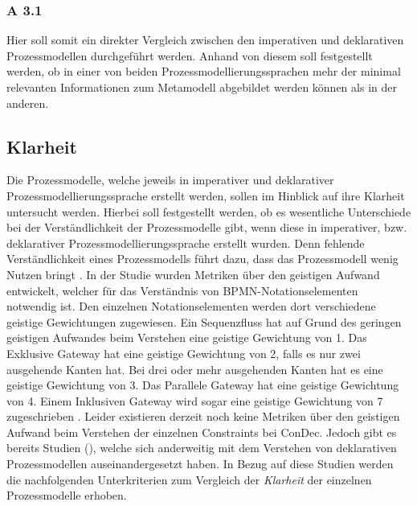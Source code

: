 \subsubsection{A 3.1}

Hier soll somit ein direkter Vergleich zwischen den imperativen und deklarativen Prozessmodellen durchgeführt werden. Anhand von diesem soll festgestellt werden, ob in einer von beiden Prozessmodellierungssprachen mehr der minimal relevanten Informationen zum Metamodell abgebildet werden können als in der anderen.\newline

\subsection{Klarheit}

Die Prozessmodelle, welche jeweils in imperativer und deklarativer Prozessmodellierungssprache erstellt werden, sollen im Hinblick auf ihre Klarheit untersucht werden. Hierbei soll festgestellt werden, ob es wesentliche Unterschiede bei der Verständlichkeit der Prozessmodelle gibt, wenn diese in imperativer, bzw. deklarativer Prozessmodellierungssprache erstellt wurden. Denn fehlende Verständlichkeit eines Prozessmodells führt dazu, dass das Prozessmodell wenig Nutzen bringt \cite{journals95, freund2007,reinshagen2009}. \newline
In der Studie \cite{gruhn2006adopting} wurden Metriken über den geistigen Aufwand entwickelt, welcher für das Verständnis von BPMN-Notationselementen notwendig ist. Den einzelnen Notationselementen werden dort verschiedene geistige Gewichtungen zugewiesen. Ein Sequenzfluss hat auf Grund des geringen geistigen Aufwandes beim Verstehen eine geistige Gewichtung von 1. Das Exklusive Gateway hat eine geistige Gewichtung von 2, falls es nur zwei ausgehende Kanten hat. Bei drei oder mehr ausgehenden Kanten hat es eine geistige Gewichtung von 3. Das Parallele Gateway hat eine geistige Gewichtung von 4. Einem Inklusiven Gateway wird sogar eine geistige Gewichtung von 7 zugeschrieben \cite{gruhn2006adopting}.\newline
Leider existieren derzeit noch keine Metriken über den geistigen Aufwand beim Verstehen der einzelnen Constraints bei ConDec. Jedoch gibt es bereits Studien (\cite{thesis_maja,haisjackl2014understanding}), welche sich anderweitig mit dem Verstehen von deklarativen Prozessmodellen auseinandergesetzt haben. In Bezug auf diese Studien werden die nachfolgenden Unterkriterien zum Vergleich der \textit{Klarheit} der einzelnen Prozessmodelle erhoben.

